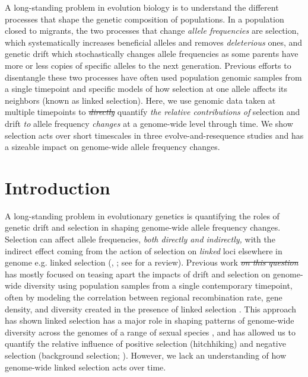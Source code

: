 \documentclass[11pt]{article}
\newcommand{\vb}[1]{{\it \color{blue} #1}}
\newcommand{\vbout}[1]{{\it \color{blue} \sout{#1}}}
\begin{document}
A long-standing problem in evolution biology is to understand the different
processes that shape the genetic composition of populations. In a population
closed to migrants, the two processes that change \vb{allele frequencies} are
selection, which systematically increases beneficial alleles and removes
\vb{deleterious} ones, and genetic drift which stochastically changes allele
frequencies as some parents have more or less copies of specific alleles to the
next generation. Previous efforts to disentangle these two processes have often
used population genomic samples from a single timepoint and specific models of
how selection at one allele affects its neighbors (known as linked selection).
Here, we use genomic data taken at multiple timepoints to \vbout{directly}
quantify \vb{the relative contributions of} selection and drift \vb{to} allele
frequency \vb{changes} at a genome-wide level through time. We show selection acts
over short timescales in three evolve-and-resequence studies and has a sizeable
impact on genome-wide allele frequency changes. 




\section{Introduction}

A long-standing problem in evolutionary genetics is quantifying the roles of
genetic drift and selection in shaping genome-wide allele frequency changes.
Selection can affect allele frequencies, \vb{both directly and indirectly,}
with the indirect effect coming from the action of selection on \vb{linked}
loci elsewhere in genome e.g. linked selection (\cite{Maynard_Smith1974-lc},
\cite{Charlesworth1993-gb,Nordborg1996-nq}; see \cite{Barton2000-zg} for a
review). Previous work \vbout{on this question} has mostly focused on teasing
apart the impacts of drift and selection on genome-wide diversity using
population samples from a single contemporary timepoint, often by modeling the
correlation between regional recombination rate, gene density, and diversity
created in the presence of linked selection
\parencite{Cutter2013-ba,Sella2009-nx}. This approach has shown linked
selection has a major role in shaping patterns of genome-wide diversity across
the genomes of a range of sexual species
\parencite{Macpherson2007-qt,Andolfatto2007-uy,Begun2007-bg,Beissinger2016-cm,Sattath2011-dr,Williamson2014-oy,Andersen2012-bj,Cutter2010-gi,Elyashiv2016-vt},
and has allowed us to quantify the relative influence of positive selection
(hitchhiking) and negative selection (background selection;
\cite{Nordborg2005-dc,McVicker2009-ax,Andolfatto2007-uy,Macpherson2007-qt,Hernandez2011-gs,Elyashiv2016-vt}).
However, we lack an understanding of how genome-wide linked selection acts over
time.
\end{document}

